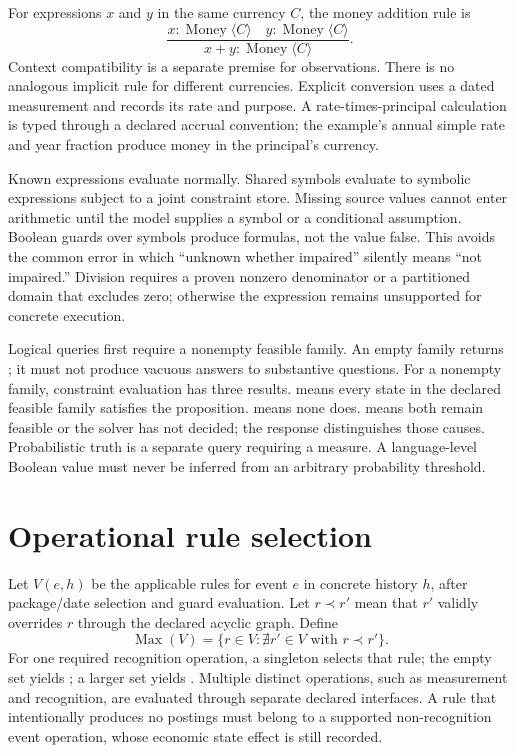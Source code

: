 For expressions $x$ and $y$ in the same currency $C$, the money addition rule is
\[
 \frac{x:\operatorname{Money}\langle C\rangle\quad
       y:\operatorname{Money}\langle C\rangle}
      {x+y:\operatorname{Money}\langle C\rangle}.
\]
Context compatibility is a separate premise for observations. There is no
analogous implicit rule for different currencies. Explicit conversion uses
a dated measurement and records its rate and purpose. A rate-times-principal
calculation is typed through a declared accrual convention; the example's
annual simple rate and year fraction produce money in the principal's currency.

Known expressions evaluate normally. Shared symbols evaluate to symbolic
expressions subject to a joint constraint store. Missing source values cannot
enter arithmetic until the model supplies a symbol or a conditional assumption.
Boolean guards over symbols produce formulas, not the value false. This avoids
the common error in which ``unknown whether impaired'' silently means
``not impaired.'' Division requires a proven nonzero denominator or a
partitioned domain that excludes zero; otherwise the expression remains
unsupported for concrete execution.

Logical queries first require a nonempty feasible family. An empty family
returns ; it must not produce vacuous answers to substantive
questions. For a nonempty family, constraint evaluation has three results.
 means every state in
the declared feasible family satisfies the proposition.  means
none does.  means both remain feasible or the solver has
not decided; the response distinguishes those causes. Probabilistic truth is
a separate query requiring a measure. A language-level Boolean value must
never be inferred from an arbitrary probability threshold.

\section{Operational rule selection}

Let $V(e,h)$ be the applicable rules for event $e$ in concrete history $h$,
after package/date selection and guard evaluation. Let $r\prec r'$ mean that
$r'$ validly overrides $r$ through the declared acyclic graph. Define
\[
 \operatorname{Max}(V)=\{r\in V:\nexists r'\in V\text{ with }r\prec r'\}.
\]
For one required recognition operation, a singleton selects that rule; the
empty set yields ; a larger set yields
. Multiple distinct operations, such as measurement and
recognition, are evaluated through separate declared interfaces. A rule that
intentionally produces no postings must belong to a supported non-recognition
event operation, whose economic state effect is still recorded.


